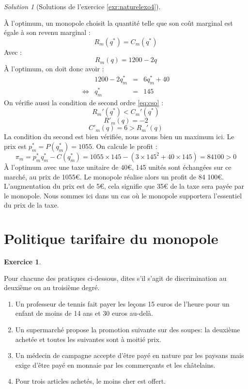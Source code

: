 \documentclass[
]{book}
\providecommand{\tightlist}{%
  \setlength{\itemsep}{0pt}\setlength{\parskip}{0pt}}
\theoremstyle{definition}
\theoremstyle{definition}
\theoremstyle{definition}
\newtheorem{exercise}{Exercice}[chapter]
\theoremstyle{definition}
\theoremstyle{remark}
\newtheorem*{solution}{Solution}
\begin{document}
\begin{solution}[Solutions de l'exercice \ref{exr:naturelexo4}]
\begin{enumerate}
  À l'optimum, un monopole choisit la quantité telle que son coût marginal est égale à son revenu marginal :
  \[R_m(q^*)=C_m(q^*)\]
  Avec :
  \[R_m(q)=1200-2q\]
  À l'optimum, on doit donc avoir :
  \[
  \begin{array}{crcl}
  &1200-2q^*_m&=&6q^*_m+40\\
  \Leftrightarrow & q^*_m&=&145
  \end{array}
  \]
  On vérifie aussi la condition de second ordre \eqref{eq:cso} :
  \[R_m'(q^*)<C_m'(q^*)\]
  \[R'_m(q)=-2\]
  \[C'_m(q)=6>R_m'(q)\]
  La condition du second est bien vérifiée, nous avons bien un maximum ici.
  Le prix est \(p^*_m=P(q^*_m)=1055\).
  On calcule le profit :
  \[\pi_m=p_m^*q_m^*-C(q^*_m)=1055\times145-(3\times145^2+40\times 145)=84100>0\]
  À l'optimum avec une taxe unitaire de 40€, 145 unités sont échangées sur ce marché, au prix de 1055€.
  Le monopole réalise alors un profit de 84 100€.
  L'augmentation du prix est de 5€, cela signifie que 35€ de la taxe sera payée par le monopole.
  Nous sommes ici dans un cas où le monopole supportera l'essentiel du prix de la taxe.
\end{enumerate}

\end{solution}

\hypertarget{politique-tarifaire-du-monopole}{%
\section{Politique tarifaire du monopole}\label{politique-tarifaire-du-monopole}}

\begin{exercise}
\protect\hypertarget{exr:discriminationquestions}{}\label{exr:discriminationquestions}

Pour chacune des pratiques ci-dessous, dites s'il s'agit de discrimination au deuxième ou au troisième degré.

\begin{enumerate}
\def\labelenumi{\arabic{enumi}.}
\tightlist
\item
  Un professeur de tennis fait payer les leçons 15 euros de l'heure pour un enfant de moins de 14 ans et 30 euros au-delà.
\item
  Un supermarché propose la promotion suivante sur des soupes: la deuxième achetée et toutes les suivantes sont à moitié prix.
\item
  Un médecin de campagne accepte d'être payé en nature par les paysans mais exige d'être payé en monnaie par les commerçants et les châtelains.
\item
  Pour trois articles achetés, le moins cher est offert.
\end{enumerate}

\end{exercise}
\end{document}
